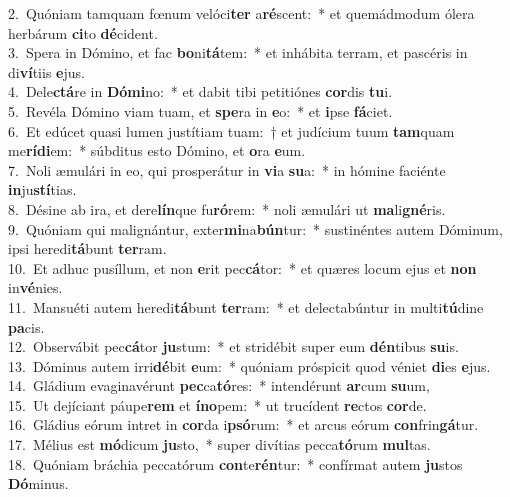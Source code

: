 {2.~}Quóniam tamquam fœnum velóci\textbf{ter} a\textbf{ré}scent:~* et quemádmodum ólera herbárum \textbf{ci}to \textbf{dé}cident.\\
{3.~}Spera in Dómino, et fac \textbf{bo}ni\textbf{tá}tem:~* et inhábita terram, et pascéris in di\textbf{ví}tiis \textbf{e}jus.\\
{4.~}Dele\textbf{ctá}re in \textbf{Dó}\textbf{mi}no:~* et dabit tibi petitiónes \textbf{cor}dis \textbf{tu}i.\\
{5.~}Revéla Dómino viam tuam, et \textbf{spe}ra in \textbf{e}o:~* et \textbf{i}pse \textbf{fá}ciet.\\
{6.~}Et edúcet quasi lumen justítiam tuam:~† et judícium tuum \textbf{tam}quam me\textbf{rí}\textbf{di}em:~* súbditus esto Dómino, et \textbf{o}ra \textbf{e}um.\\
{7.~}Noli æmulári in eo, qui prosperátur in \textbf{vi}a \textbf{su}a:~* in hómine faciénte \textbf{in}ju\textbf{stí}tias.\\
{8.~}Désine ab ira, et dere\textbf{lín}que fu\textbf{ró}rem:~* noli æmulári ut \textbf{ma}li\textbf{gné}ris.\\
{9.~}Quóniam qui malignántur, exter\textbf{mi}na\textbf{bún}tur:~* sustinéntes autem Dóminum, ipsi heredi\textbf{tá}bunt \textbf{ter}ram.\\
{10.~}Et adhuc pusíllum, et non \textbf{e}rit pec\textbf{cá}tor:~* et quæres locum ejus et \textbf{non} in\textbf{vé}nies.\\
{11.~}Mansuéti autem heredi\textbf{tá}bunt \textbf{ter}ram:~* et delectabúntur in multi\textbf{tú}dine \textbf{pa}cis.\\
{12.~}Observábit pec\textbf{cá}tor \textbf{ju}stum:~* et stridébit super eum \textbf{dén}tibus \textbf{su}is.\\
{13.~}Dóminus autem irri\textbf{dé}bit \textbf{e}um:~* quóniam próspicit quod véniet \textbf{di}es \textbf{e}jus.\\
{14.~}Gládium evaginavérunt \textbf{pec}ca\textbf{tó}res:~* intendérunt \textbf{ar}cum \textbf{su}um,\\
{15.~}Ut dejíciant páupe\textbf{rem} et \textbf{í}\textbf{no}pem:~* ut trucídent \textbf{re}ctos \textbf{cor}de.\\
{16.~}Gládius eórum intret in \textbf{cor}da i\textbf{psó}rum:~* et arcus eórum \textbf{con}frin\textbf{gá}tur.\\
{17.~}Mélius est \textbf{mó}dicum \textbf{ju}sto,~* super divítias pecca\textbf{tó}rum \textbf{mul}tas.\\
{18.~}Quóniam bráchia peccatórum \textbf{con}te\textbf{rén}tur:~* confírmat autem \textbf{ju}stos \textbf{Dó}minus.\\
